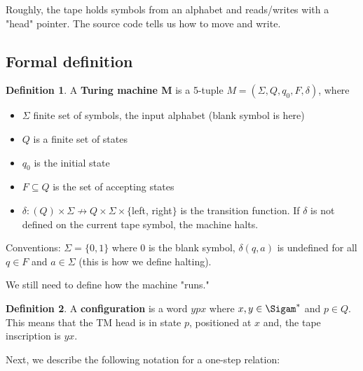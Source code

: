 \documentclass[11pt]{article}
\theoremstyle{plain}
\theoremstyle{definition}
\newtheorem*{defn}{Definition}
\begin{document}
Roughly, the tape holds symbols from an alphabet and reads/writes with a "head" pointer. The source code tells us how to move and write.

\subsection{Formal definition}

\begin{defn}
    A {\bf Turing machine M} is a 5-tuple $M = (\Sigma, Q, q_0, F, \delta)$, where
    \begin{itemize}
        \item $\Sigma$ finite set of symbols, the input alphabet (blank symbol is here)
        \item $Q$ is a finite set of states
        \item $q_0$ is the initial state 
        \item $F \subseteq Q$ is the set of accepting states 
        \item $\delta: (Q) \times \Sigma \nrightarrow Q \times \Sigma \times \{$left, right$\}$ is the transition function. If $\delta$ 
            is not defined on the current tape symbol, the machine halts.
    \end{itemize}
\end{defn}

Conventions: $\Sigma = \{0, 1\}$ where 0 is the blank symbol, $\delta(q, a)$ is undefined for all $q \in F$ and $a \in \Sigma$ (this is
how we define halting).

We still need to define how the machine "runs."

\begin{defn}
    A {\bf configuration} is a word $ypx$ where $x, y \in \Sigam^*$ and $p \in Q$. This means that the TM head is in state $p$,
    positioned at $x$ and, the tape inscription is $yx$.
\end{defn}

Next, we describe the following notation for a one-step relation:
$$
\end{document}

